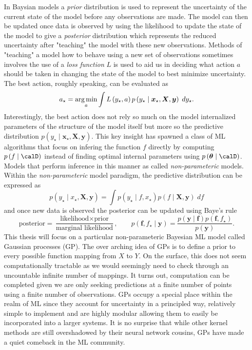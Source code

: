 In Baysian models a {\it prior} distribution is used to represent the uncertainty of the current state of the model before any observations are made. The model can then be updated once data is observed by using the likelihood to update the state of the model to give a {\it posterior} distribution which represents the reduced uncertainty after "teaching" the model with these new observations. Methods of "teaching" a model how to behave using a new set of observations sometimes involves the use of a {\it loss function} $L$ is used to aid us in deciding what action $a$ should be taken in changing the state of the model to best minimize uncertainty. The best action, roughly speaking, can be evaluated as
\begin{equation*}
    a_{\star} =  \operatorname*{\arg\min}_{a} \int L \left( y_{\star} , a \right) p \left( y_{\star} \mid \bm{x}_{\star}, \bm{X}, \bm{y} \right) \; d y_{\star}.
\end{equation*}
Interestingly, the best action does not rely so much on the model internalized parameters of the structure of the model itself but more so the predictive distribution $p \left( y_{\star} \mid \bm{x}_{\star}, \bm{X}, \bm{y} \right)$. This key insight has spawned a class of ML algorithms that focus on infering the function $f$ directly by computing $p \left( f \mid \calD \right)$ instead of finding optimal internal parameters using $p \left( \bm{\theta} \mid \calD \right)$. Models that perform inference in this manner as called {\it non-parameteric} models. Within the {\it non-parameteric} model paradigm, the predictive distribution can be expressed as
\begin{equation*}
    p \left( y_{\star} \mid x_{\star} , \bm{X} , \bm{y} \right) = \int p \left( y_{\star} \mid f , x_{\star} \right) p \left( f \mid \bm{X} , \bm{y} \right) \; df
\end{equation*}
and once new data is observed the posterior can be updated using Baye's rule
\begin{equation*}
    \text{posterior} = \frac{\text{likelihood} \times \text{prior}}{\text{marginal likelihood}}, \qquad p \left( \bm{f} , f_{\star} \mid \bm{y} \right) = \frac{p \left( \bm{y} \mid \bm{f} \right) p \left( \bm{f} , f_{\star} \right) }{p \left( \bm{y} \right)}.
\end{equation*}
This thesis will focus on a particular non-parameteric Bayesian ML model called Gaussian processes (GP). The over arching idea of GPs is to define a prior to every possible function mapping from $X$ to $Y$. On the surface, this does not seem computationally tractable as we would seemingly need to check through an uncountable infinite number of mappings. It turns out, computation can be completed given we are only seeking predictions at a finite number of points using a finite number of observations. GPs occupy a special place within the realm of ML since they account for uncertainty in a principled way, relatively simple to implement and are highly modular allowing them to easily be incorporated into a larger systems. It is no surprise that while other kernel methods are still overshadowed by their neural network cousins, GPs have made a quiet comeback in the ML community.

